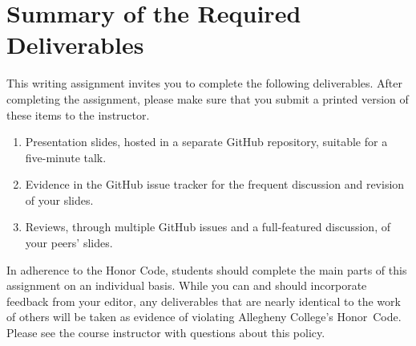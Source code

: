 \vspace*{-.1in}
\section*{Summary of the Required Deliverables}

This writing assignment invites you to complete the following deliverables. After completing the assignment, please make
sure that you submit a printed version of these items to the instructor.

\vspace*{-.1in}
\begin{enumerate}
  \setlength{\itemsep}{-.01in}

  \item Presentation slides, hosted in a separate GitHub repository, suitable for a five-minute talk.
  \item Evidence in the GitHub issue tracker for the frequent discussion and revision of your slides.
  \item Reviews, through multiple GitHub issues and a full-featured discussion, of your peers' slides.

\end{enumerate}
\vspace*{-.1in}

In adherence to the Honor Code, students should complete the main parts of this assignment on an individual basis. While
you can and should incorporate feedback from your editor, any deliverables that are nearly identical to the work of
others will be taken as evidence of violating Allegheny College's \mbox{Honor Code}. Please see the course instructor
with questions about this policy.


